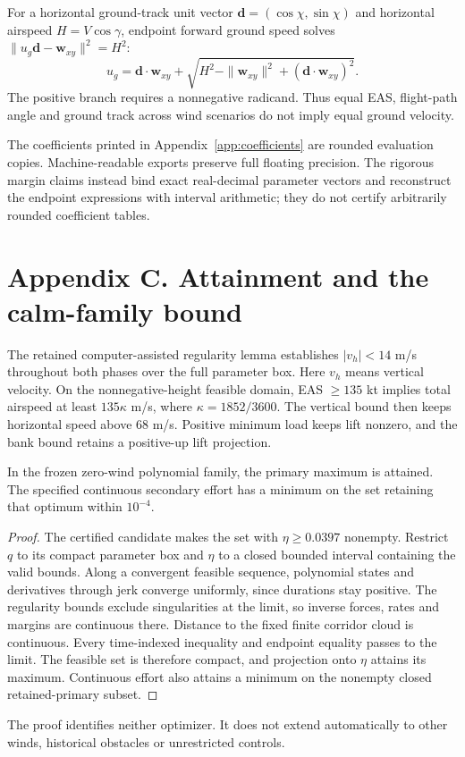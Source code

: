 For a horizontal ground-track unit vector $\mathbf d=(\cos\chi,\sin\chi)$ and horizontal airspeed $H=V\cos\gamma$, endpoint forward ground speed solves $\|u_g\mathbf d-\mathbf w_{xy}\|^2=H^2$:
\[
u_g=\mathbf d\cdot\mathbf w_{xy}+\sqrt{H^2-\|\mathbf w_{xy}\|^2+(\mathbf d\cdot\mathbf w_{xy})^2}.
\]
The positive branch requires a nonnegative radicand. Thus equal EAS, flight-path angle and ground track across wind scenarios do not imply equal ground velocity.

The coefficients printed in Appendix~\ref{app:coefficients} are rounded evaluation copies. Machine-readable exports preserve full floating precision. The rigorous margin claims instead bind exact real-decimal parameter vectors and reconstruct the endpoint expressions with interval arithmetic; they do not certify arbitrarily rounded coefficient tables.
\clearpage
\section{Appendix C. Attainment and the calm-family bound}\label{app:bounds}
The retained computer-assisted regularity lemma establishes $|v_h|<14$ m/s throughout both phases over the full parameter box. Here $v_h$ means vertical velocity. On the nonnegative-height feasible domain, EAS $\geq135$ kt implies total airspeed at least $135\kappa$ m/s, where $\kappa=1852/3600$. The vertical bound then keeps horizontal speed above 68 m/s. Positive minimum load keeps lift nonzero, and the bank bound retains a positive-up lift projection.

\begin{proposition}
In the frozen zero-wind polynomial family, the primary maximum is attained. The specified continuous secondary effort has a minimum on the set retaining that optimum within $10^{-4}$.
\end{proposition}
\begin{proof}
The certified candidate makes the set with $\eta\geq0.0397$ nonempty. Restrict $q$ to its compact parameter box and $\eta$ to a closed bounded interval containing the valid bounds. Along a convergent feasible sequence, polynomial states and derivatives through jerk converge uniformly, since durations stay positive. The regularity bounds exclude singularities at the limit, so inverse forces, rates and margins are continuous there. Distance to the fixed finite corridor cloud is continuous. Every time-indexed inequality and endpoint equality passes to the limit. The feasible set is therefore compact, and projection onto $\eta$ attains its maximum. Continuous effort also attains a minimum on the nonempty closed retained-primary subset.
\end{proof}
The proof identifies neither optimizer. It does not extend automatically to other winds, historical obstacles or unrestricted controls.

